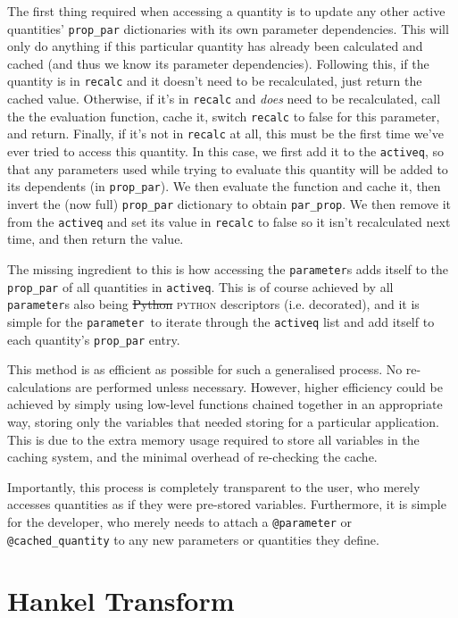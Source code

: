 \documentclass[5p,aas_macros]{elsarticle}
\newcommand{\python}{\textsc{python}\xspace} %
\newcommand{\parameter}{\texttt{parameter}\xspace} %
\providecommand{\DIFdeltex}[1]{{\protect\color{red}\sout{#1}}}                      %
\providecommand{\DIFaddbegin}{} %
\providecommand{\DIFaddend}{} %
\providecommand{\DIFdelbegin}{} %
\providecommand{\DIFdelend}{} %
\providecommand{\DIFdel}[1]{\texorpdfstring{\DIFdeltex{#1}}{}} %
\begin{document}
The first thing required when accessing a quantity is to update any other active quantities' \verb|prop_par| dictionaries with its own parameter dependencies. This will only do anything if this particular quantity has already been calculated and cached (and thus we know its parameter dependencies). 
Following this, if the quantity is in \verb|recalc| and it doesn't need to be recalculated, just return the cached value.
Otherwise, if it's in \verb|recalc| and \textit{does} need to be recalculated, call the the evaluation function, cache it, switch \verb|recalc| to false for this parameter, and return.
Finally, if it's not in \verb|recalc| at all, this must be the first time we've ever tried to access this quantity. In this case, we first add it to the \verb|activeq|, so that any parameters used while trying to evaluate this quantity will be added to its dependents (in \verb|prop_par|). 
We then evaluate the function and cache it, then invert the (now full) \verb|prop_par| dictionary to obtain \verb|par_prop|. We then remove it from the \verb|activeq| and set its value in \verb|recalc| to false so it isn't recalculated next time, and then return the value.

The missing ingredient to this is how accessing the \texttt{parameter}s adds itself to the \verb|prop_par| of all quantities in \verb|activeq|. This is of course achieved
by all \texttt{parameter}s also being \DIFdelbegin \DIFdel{Python }\DIFdelend \DIFaddbegin \python \DIFaddend descriptors (i.e. decorated), and it is simple for the \parameter\ to iterate through the \verb|activeq| list and add itself to each quantity's \verb|prop_par| entry.

This method is as efficient as possible for such a generalised process. No re-calculations are performed unless necessary. However, higher efficiency could be achieved by simply using low-level functions chained together in an appropriate way, storing only the variables that needed storing for a particular application. This is due to the extra memory usage required to store all variables in the caching system, and the minimal overhead of re-checking the cache. 

Importantly, this process is completely transparent to the user, who merely accesses quantities as if they were pre-stored variables. Furthermore, it is simple for the developer, who merely needs to attach a \verb|@parameter| or \verb|@cached_quantity| to any new parameters or quantities they define. 
\section{Hankel Transform}
 \label{app:hankel}
\end{document}
